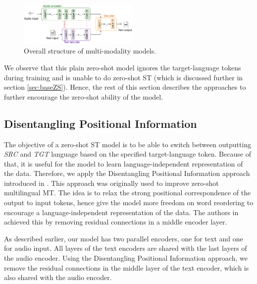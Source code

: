 \documentclass[conference]{IEEEtran}
\begin{document}
	\begin{figure}[htbp]
		\centerline{\includegraphics[width=0.52\textwidth]{charts/OverallStructure.pdf}}
		\caption{Overall structure of multi-modality models.}
		\label{fig:OverallStructure}
	\end{figure}
	
	We observe that this plain zero-shot model ignores the target-language tokens during training and is unable to do zero-shot ST (which is discussed further in section \ref{sec:baseZS}). Hence, the rest of this section describes the approaches to further encourage the zero-shot ability of the model.
	
	\subsection{Disentangling Positional Information} \label{sec:DEPI}
	The objective of a zero-shot ST model is to be able to switch between outputting \textit{SRC} and \textit{TGT} language based on the specified target-language token. Because of that, it is useful for the model to learn language-independent representation of the data. Therefore, we apply the  Disentangling Positional Information approach introduced in \cite{DEPI}. This approach was originally used to improve zero-shot multilingual MT. The idea is to relax the strong positional correspondence of the output to input tokens, hence give the model more freedom on word reordering to encourage a language-independent representation of the data. The authors in \cite{DEPI} achieved this by removing residual connections in a middle encoder layer. 
	
	As described earlier, our model has two parallel encoders, one for text and one for audio input. All layers of the text encoders are shared with the last layers of the audio encoder. Using the Disentangling Positional Information approach, we remove the residual connections in the middle layer of the text encoder, which is also shared with the audio encoder.
	
\end{document}
